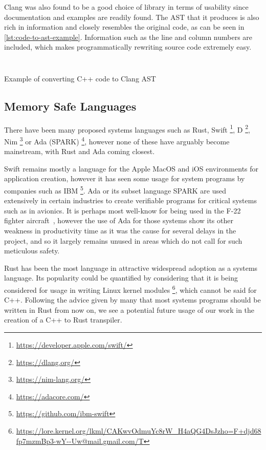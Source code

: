 \documentclass{proposal}
\begin{document}
    Clang was also found to be a good choice of library in terms of usability since documentation and examples are readily found.
    The AST that it produces is also rich in information and closely resembles the original code, as can be seen in \autoref{lst:code-to-ast-example}.
    Information such as the line and column numbers are included, which makes programmatically rewriting source code extremely easy.

    \begin{listing}
        \inputminted{c++}{code/code-to-ast.cpp}
        \inputminted[fontsize=\footnotesize]{text}{code/code-to-ast.txt}
        \caption{Example of converting C++ code to Clang AST}
        \label{lst:code-to-ast-example}
    \end{listing}

    \subsection{Memory Safe Languages}\label{subsec:rust}

    There have been many proposed systems languages such as Rust, Swift \footnote{\url{https://developer.apple.com/swift/}}, D \footnote{\url{https://dlang.org/}}, Nim \footnote{\url{https://nim-lang.org/}} or Ada (SPARK) \footnote{\url{https://adacore.com/}}, however none of these have arguably become mainstream, with Rust and Ada coming closest.

    Swift remains mostly a language for the Apple MacOS and iOS environments for application creation, however it has seen some usage for system programs by companies such as IBM \footnote{\url{https://github.com/ibm-swift}}.
    Ada or its subset language SPARK are used extensively in certain industries to create verifiable programs for critical systems such as in avionics.
    It is perhaps most well-know for being used in the F-22 fighter aircraft~\cite{malas1997f}, however the use of Ada for those systems show its other weakness in productivity time as it was the cause for several delays in the project, and so it largely remains unused in areas which do not call for such meticulous safety.

    Rust has been the most language in attractive widespread adoption as a systems language.
    Its popularity could be quantified by considering that it is being considered for usage in writing Linux kernel modules \footnote{\url{https://lore.kernel.org/lkml/CAKwvOdmuYc8rW_H4aQG4DsJzho=F+djd68fp7mzmBp3-wY--Uw@mail.gmail.com/T}}, which cannot be said for C++.
    Following the advice given by many that most systems programs should be written in Rust from now on, we see a potential future usage of our work in the creation of a C++ to Rust transpiler.
\end{document}
